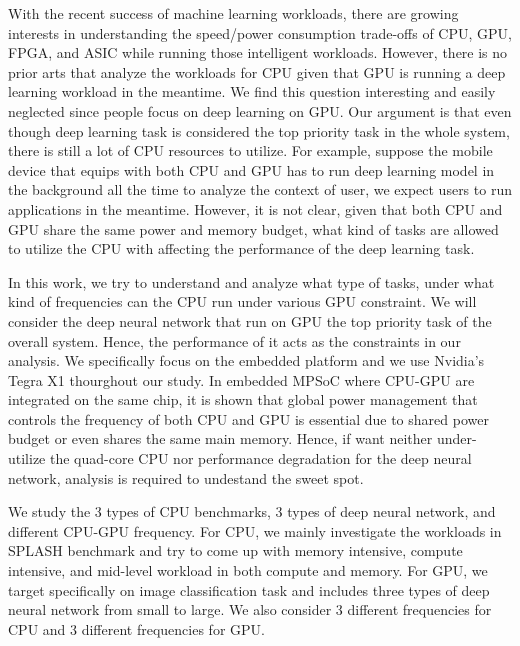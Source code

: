 With the recent success of machine learning workloads, there are growing interests in understanding the speed/power consumption trade-offs of CPU, GPU, FPGA, and ASIC while running those intelligent workloads\cite{malik2016architecture, nurvitadhi2016accelerating}. However, there is no prior arts that analyze the workloads for CPU given that GPU is running a deep learning workload in the meantime. We find this question interesting and easily neglected since people focus on deep learning on GPU. Our argument is that even though deep learning task is considered the top priority task in the whole system, there is still a lot of CPU resources to utilize. For example, suppose the mobile device that equips with both CPU and GPU has to run deep learning model in the background all the time to analyze the context of user, we expect users to run applications in the meantime. However, it is not clear, given that both CPU and GPU share the same power and memory budget, what kind of tasks are allowed to utilize the CPU with affecting the performance of the deep learning task.

In this work, we try to understand and analyze what type of tasks, under what kind of frequencies can the CPU run under various GPU constraint. We will consider the deep neural network that run on GPU the top priority task of the overall system. Hence, the performance of it acts as the constraints in our analysis. We specifically focus on the embedded platform and we use Nvidia's Tegra X1 thourghout our study. In embedded MPSoC where CPU-GPU are integrated on the same chip, it is shown that global power management that controls the frequency of both CPU and GPU is essential due to shared power budget \cite{pathania2014integrated} or even shares the same main memory. Hence, if want neither under-utilize the quad-core CPU nor performance degradation for the deep neural network, analysis is required to undestand the sweet spot.

We study the 3 types of CPU benchmarks, 3 types of deep neural network, and different CPU-GPU frequency. For CPU, we mainly investigate the workloads in SPLASH benchmark and try to come up with memory intensive, compute intensive, and mid-level workload in both compute and memory. For GPU, we target specifically on image classification task and includes three types of deep neural network from small to large. We also consider 3 different frequencies for CPU and 3 different frequencies for GPU.